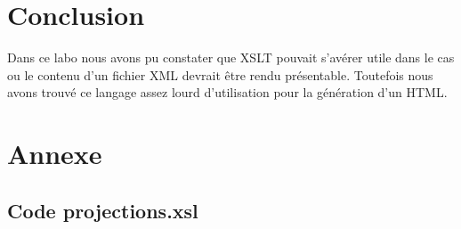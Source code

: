 \documentclass[french]{article}
\begin{document}
    \section{Conclusion}
    Dans ce labo nous avons pu constater que XSLT pouvait s'avérer utile dans le
    cas ou le contenu d'un fichier XML devrait être rendu présentable. Toutefois
    nous avons trouvé ce langage assez lourd d'utilisation pour la génération
    d'un HTML.

    \newpage

    \section{Annexe}
    \subsection{Code projections.xsl}
    
\end{document}
